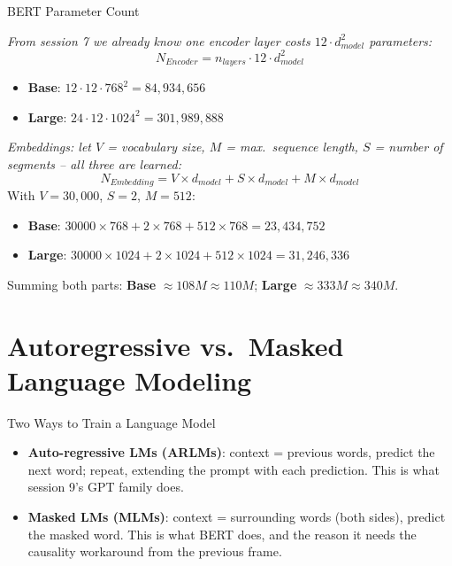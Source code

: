\begin{vbframe}{BERT Parameter Count}

\textit{From session 7 we already know one encoder layer costs $12\cdot d_{model}^2$ parameters:}
$$N_{Encoder} = n_{layers} \cdot 12\cdot d_{model}^2$$
\begin{itemize}
	\item \textbf{Base}: $12\cdot 12\cdot 768^2 = 84{,}934{,}656$
	\item \textbf{Large}: $24\cdot 12\cdot 1024^2 = 301{,}989{,}888$
\end{itemize}

\framebreak

\textit{Embeddings: let $V$ = vocabulary size, $M$ = max.\ sequence length, $S$ = number of segments -- all three are learned:}
$$N_{Embedding} = V\times d_{model} + S\times d_{model} + M\times d_{model}$$
With $V=30{,}000$, $S=2$, $M=512$:
\begin{itemize}
	\item \textbf{Base}: $30000\times768 + 2\times768 + 512\times768 = 23{,}434{,}752$
	\item \textbf{Large}: $30000\times1024 + 2\times1024 + 512\times1024 = 31{,}246{,}336$
\end{itemize}
Summing both parts: \textbf{Base} $\approx 108M \approx 110M$; \textbf{Large} $\approx 333M \approx 340M$.

\end{vbframe}


\section{Autoregressive vs.\ Masked Language Modeling}

\begin{vbframe}{Two Ways to Train a Language Model}
\begin{itemize}
	\item \textbf{Auto-regressive LMs (ARLMs)}: context = previous words, predict the next word; repeat, extending the prompt with each prediction. This is what session 9's GPT family does.
	\item \textbf{Masked LMs (MLMs)}: context = surrounding words (both sides), predict the masked word. This is what BERT does, and the reason it needs the causality workaround from the previous frame.
\end{itemize}
\end{vbframe}

